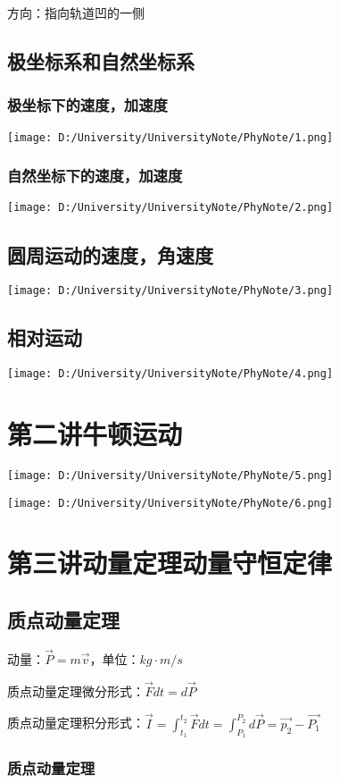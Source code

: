 \documentclass[UTF8]{article}
\begin{document}
    \;\;方向：指向轨道凹的一侧

\subsection{极坐标系和自然坐标系}
\subsubsection{极坐标下的速度，加速度}
\texttt{[image: D:/University/UniversityNote/PhyNote/1.png]}
\subsubsection{自然坐标下的速度，加速度}
\texttt{[image: D:/University/UniversityNote/PhyNote/2.png]}
\subsection{圆周运动的速度，角速度}
\texttt{[image: D:/University/UniversityNote/PhyNote/3.png]}
\subsection{相对运动}
\texttt{[image: D:/University/UniversityNote/PhyNote/4.png]}
\newpage
\section{第二讲\;\;牛顿运动}
\texttt{[image: D:/University/UniversityNote/PhyNote/5.png]}

\texttt{[image: D:/University/UniversityNote/PhyNote/6.png]}
\newpage
\section{第三讲\;\;动量定理\;\;动量守恒定律}
\subsection{质点动量定理}

    动量：$\vec{P} = m\vec{v}$，单位：$kg\cdot m/s$
    
    质点动量定理微分形式：$\vec{F}dt = d\vec{P}$

    质点动量定理积分形式：$\vec{I} = \int_{t_1}^{t_2}\vec{F}dt = \int_{P_1}^{P_2}d\vec{P} = \vec{p_2} - \vec{P_1}$

\subsubsection{质点动量定理}
\end{document}
